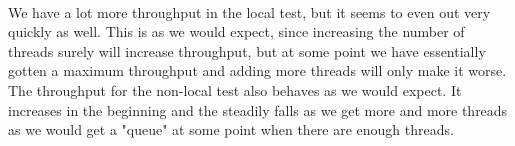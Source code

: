 \documentclass[a4paper]{article}
\begin{document}
$ $ \\
We have a lot more throughput in the local test, but it seems to even out very quickly as well. This is as we would expect, since increasing the number of threads surely will increase throughput, but at some point we have essentially gotten a maximum throughput and adding more threads will only make it worse. The throughput for the non-local test also behaves as we would expect. It increases in the beginning and the steadily falls as we get more and more threads as we would get a "queue" at some point when there are enough threads.
\end{document}
